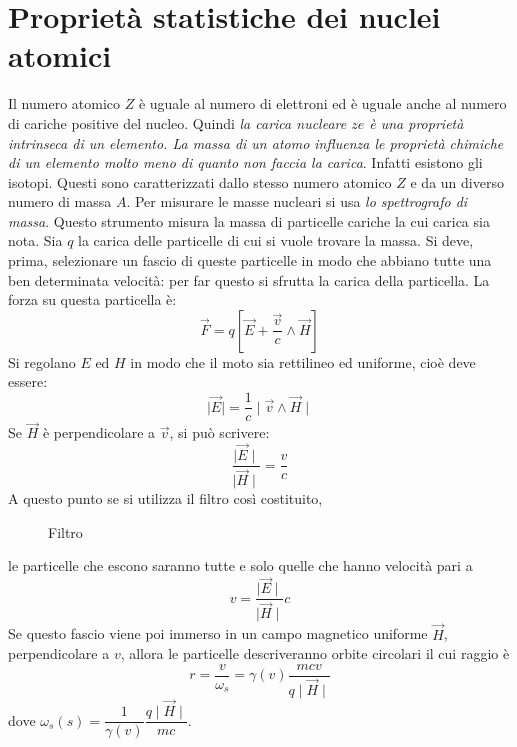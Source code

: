 \chapter{Proprietà statistiche dei nuclei atomici}
Il numero atomico $Z$  è uguale al numero di elettroni ed
è uguale anche al numero di cariche positive del nucleo. Quindi \textit{la
carica nucleare $ze$ è una proprietà intrinseca di un elemento. La massa di un
atomo influenza le proprietà chimiche di un elemento molto meno di quanto non
faccia la carica}. Infatti esistono gli isotopi. Questi sono caratterizzati
dallo stesso numero atomico $Z$ e da un diverso numero di massa $A$. Per
misurare le masse nucleari si usa \textit{lo spettrografo di massa}. Questo
strumento misura la massa di particelle cariche la cui carica sia nota. Sia $q$
la carica delle particelle di cui si vuole trovare la massa. Si deve, prima,
selezionare un fascio di queste particelle in modo che abbiano tutte una ben
determinata velocità: per far questo si sfrutta la carica della particella. La
forza su questa particella è:
\begin{equation}
\vec{F} = q\left[ \vec{E} + \dfrac{\vec{v}}{c}\wedge \vec{H} \right]
\end{equation}
Si regolano $E$ ed $H$ in modo che il moto sia rettilineo ed uniforme, cioè 
deve
essere:
\begin{equation}
\mid \vec{E} \mid = \dfrac{1}{c} \mid \vec{v} \wedge \vec{H} \mid
\end{equation}
Se $\vec{H}$ è perpendicolare a $\vec{v}$, si può scrivere:
\begin{equation}
\dfrac{\mid \vec{E} \mid}{\mid \vec{H} \mid} = \dfrac{v}{c}
\end{equation}
A questo punto se si utilizza il filtro così costituito,
\begin{figure}[!htbp]
	\centering
	
	\caption{Filtro}
\end{figure}
le particelle che escono saranno tutte e solo quelle che hanno velocità pari a 
\begin{equation}
v = \dfrac{\mid \vec{E}\mid}{\mid \vec{H} \mid}c
\end{equation}
Se questo fascio viene poi immerso in un campo magnetico uniforme $\vec{H}$,
perpendicolare a $v$, allora le particelle descriveranno orbite circolari il cui
raggio è
\begin{equation}
r = \dfrac{v}{\omega _{s}} = \gamma (v) \dfrac{mcv}{q \mid \vec{H} \mid}
\end{equation}
dove $\omega _s (s) = \dfrac{1}{\gamma (v)} \dfrac{q \mid \vec{H} \mid}{mc}$.


